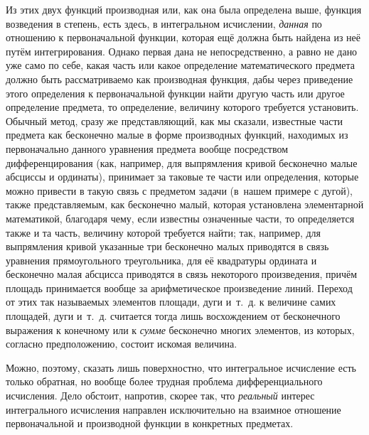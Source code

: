 Из этих двух функций производная или, как она была определена выше, функция
возведения в степень, есть здесь, в интегральном исчислении, {\em данная} по
отношению к первоначальной функции, которая ещё должна быть найдена из неё
путём интегрирования. Однако первая дана не непосредственно, а равно не дано
уже само по себе, какая часть или какое определение математического предмета
должно быть рассматриваемо как производная функция, дабы через приведение этого
определения к первоначальной функции найти другую часть или другое определение
предмета, то определение, величину которого требуется установить. Обычный
метод, сразу же представляющий, как мы сказали, известные части предмета как
бесконечно малые в форме производных функций, находимых из первоначально
данного уравнения предмета вообще посредством дифференцирования (как, например,
для выпрямления кривой бесконечно малые абсциссы и ординаты), принимает за
таковые те части или определения, которые можно привести в такую связь с
предметом задачи (в~нашем примере с дугой), также представляемым, как
бесконечно малый, которая установлена элементарной математикой, благодаря чему,
если известны означенные части, то определяется также и та часть, величину
которой требуется найти; так, например, для выпрямления кривой указанные три
бесконечно малых приводятся в связь уравнения прямоугольного треугольника, для
её квадратуры ордината и бесконечно малая абсцисса приводятся в связь
некоторого произведения, причём площадь принимается вообще за арифметическое
произведение линий. Переход от этих так называемых элементов площади, дуги
и~т.~д. к величине самих площадей, дуги и~т.~д. считается тогда лишь
восхождением от бесконечного выражения к конечному или к {\em сумме} бесконечно
многих элементов, из которых, согласно предположению, состоит искомая величина.

Можно, поэтому, сказать лишь поверхностно, что интегральное исчисление есть
только обратная, но вообще более трудная проблема дифференциального исчисления.
Дело обстоит, напротив, скорее так, что {\em реальный} интерес интегрального
исчисления направлен исключительно на взаимное отношение первоначальной и
производной функции в конкретных предметах.

